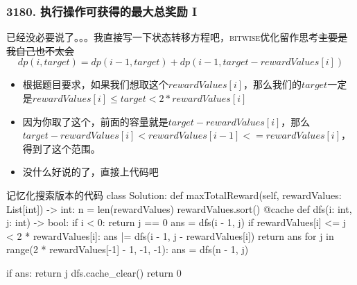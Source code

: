 \begin{frame}[fragile]          %
  \frametitle{\textsc{3180. 执行操作可获得的最大总奖励 I}}
  \begin{alertblock}{已经没必要说了。。。我直接写一下状态转移方程吧，\textsc{bitwise}优化留作思考\sout{主要是我自己也不太会}}
    \begin{equation*}
      dp(i,target)=dp(i-1,target)+dp(i-1,target-rewardValues[i])
    \end{equation*}
  \end{alertblock}
  \begin{itemize}
    \item 根据题目要求，如果我们想取这个$rewardValues[i]$，那么我们的$target$一定是$rewardValues[i] \leq target < 2 * rewardValues[i]$
    \item 因为你取了这个，前面的容量就是$target - rewardValues[i]$，那么$target - rewardValues[i] < rewardValues[i-1] <= rewardValues[i]$，得到了这个范围。
    \item 没什么好说的了，直接上代码吧
  \end{itemize}
\end{frame}


\begin{frame}[fragile]          %
  
  \begin{codeblock}[language=python]{记忆化搜索版本的代码}
class Solution:
    def maxTotalReward(self, rewardValues: List[int]) -> int:
        n = len(rewardValues)
        rewardValues.sort()
        @cache
        def dfs(i: int, j: int) -> bool:
            if i < 0:
                return j == 0
            ans = dfs(i - 1, j)
            if rewardValues[i] <= j < 2 * rewardValues[i]:
                ans |= dfs(i - 1, j - rewardValues[i])
            return ans
        for j in range(2 * rewardValues[-1] - 1, -1, -1):
            ans = dfs(n - 1, j)
  \end{codeblock}
\end{frame}


\begin{frame}[fragile]
  \begin{codeblock}[language=python]{}
            if ans:
              return j
            dfs.cache_clear()
        return 0
  \end{codeblock}
\end{frame}


